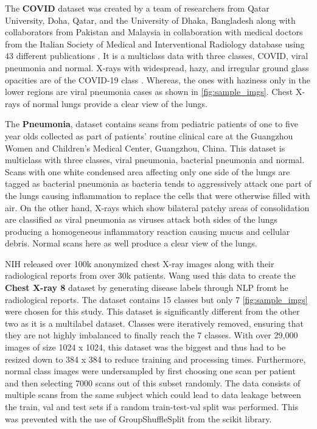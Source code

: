 \documentclass[10pt,twocolumn,letterpaper]{article}
\begin{document}
The \textbf{COVID} dataset was created by a team of researchers from Qatar University, Doha, 
Qatar, and the University of Dhaka, Bangladesh along with collaborators from Pakistan 
and Malaysia in collaboration with medical doctors from the Italian Society of Medical 
and Interventional Radiology database using 43 \cite{covidpneumonia2020data} different 
publications \cite{RAHMAN2021104319,9144185,kagglecovid}. It is a multiclass data with 
three classes, COVID, viral pneumonia and normal.  X-rays with widespread, hazy, 
and irregular ground glass opacities are of the COVID-19 class \cite{jacobi2020portable}. 
Whereas, the ones with haziness only in the lower regions \cite{zhan2021clinical} are 
viral pneumonia cases as shown in \cref{fig:sample_imgs}. Chest X-rays of normal lungs provide 
a clear view of the lungs. 

The \textbf{Pneumonia}, dataset contains scans from pediatric patients of one to five year olds 
collected as part of patients' routine clinical care at the Guangzhou Women and Children's 
Medical Center, Guangzhou, China. \cite{kermany2018labeled,kagglepneu} 
This dataset is multiclass with three classes, viral pneumonia, bacterial pneumonia and normal.
Scans with one white condensed area affecting only one 
side of the lungs are tagged as bacterial pneumonia\cite{areviral} as bacteria tends to 
aggressively attack one part of the lungs causing inflammation to replace the cells 
that were otherwise filled with air. On the other hand, X-rays which 
show bilateral patchy areas of consolidation are classified as viral pneumonia
\cite{guo2012radiological} as viruses attack both sides of the lungs producing a 
homogeneous inflammatory reaction causing mucus and cellular debris. Normal scans here as well 
produce a clear view of the lungs. 

NIH \cite{chestxray2017data} released over 100k anonymized chest X-ray images along with 
their radiological reports from over 30k patients. Wang \etal \cite{wang2017chestx} 
used this data to create the \textbf{Chest X-ray 8} dataset by generating disease labels 
through NLP fromt he radiological reports. \cite{kaggle8} The dataset contains 15 classes but only 
7 \cref{fig:sample_imgs} were chosen for this study. This dataset is significantly different from the 
other two as it is a multilabel dataset. Classes were iteratively removed, ensuring that
they are not highly imbalanced to finally reach the 7 classes. With over 29,000 images of size 
1024 x 1024, this dataset was the biggest and thus had to be resized down to 384 x 384 to 
reduce training and processing times. Furthermore, normal class images were undersampled by first
choosing one scan per patient and then selecting 7000 scans out of this subset randomly. 
The data consists of multiple scans from the same subject which could lead to data leakage between 
the train, val and test sets if a random train-test-val split was performed. 
This was prevented with the use of GroupShuffleSplit from the scikit library. 
\end{document}
